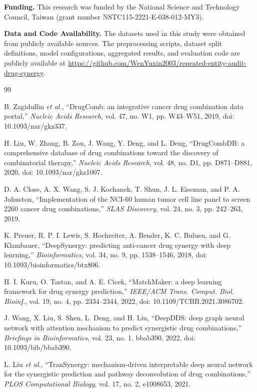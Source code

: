 \documentclass[conference]{IEEEtran}
\begin{document}
\medskip
\noindent\textbf{Funding.}
This research was funded by the National Science and Technology Council, Taiwan (grant number NSTC115-2221-E-038-012-MY3).

\medskip
\noindent\textbf{Data and Code Availability.}
The datasets used in this study were obtained from publicly available sources. The preprocessing scripts, dataset split definitions, model configurations, aggregated results, and evaluation code are publicly available at \url{https://github.com/WenYuxin2003/repeated-entity-audit-drug-synergy}.

\balance
\begin{thebibliography}{99}

B. Zagidullin \emph{et al.}, ``DrugComb: an integrative cancer drug combination data portal,'' \emph{Nucleic Acids Research}, vol. 47, no. W1, pp. W43--W51, 2019, doi: 10.1093/nar/gkz337.

H. Liu, W. Zhang, B. Zou, J. Wang, Y. Deng, and L. Deng, ``DrugCombDB: a comprehensive database of drug combinations toward the discovery of combinatorial therapy,'' \emph{Nucleic Acids Research}, vol. 48, no. D1, pp. D871--D881, 2020, doi: 10.1093/nar/gkz1007.

D. A. Close, A. X. Wang, S. J. Kochanek, T. Shun, J. L. Eiseman, and P. A. Johnston, ``Implementation of the NCI-60 human tumor cell line panel to screen 2260 cancer drug combinations,'' \emph{SLAS Discovery}, vol. 24, no. 3, pp. 242--263, 2019.

K. Preuer, R. P. I. Lewis, S. Hochreiter, A. Bender, K. C. Bulusu, and G. Klambauer, ``DeepSynergy: predicting anti-cancer drug synergy with deep learning,'' \emph{Bioinformatics}, vol. 34, no. 9, pp. 1538--1546, 2018, doi: 10.1093/bioinformatics/btx806.

H. I. Kuru, O. Tastan, and A. E. Cicek, ``MatchMaker: a deep learning framework for drug synergy prediction,'' \emph{IEEE/ACM Trans. Comput. Biol. Bioinf.}, vol. 19, no. 4, pp. 2334--2344, 2022, doi: 10.1109/TCBB.2021.3086702.

J. Wang, X. Liu, S. Shen, L. Deng, and H. Liu, ``DeepDDS: deep graph neural network with attention mechanism to predict synergistic drug combinations,'' \emph{Briefings in Bioinformatics}, vol. 23, no. 1, bbab390, 2022, doi: 10.1093/bib/bbab390.

L. Liu \emph{et al.}, ``TranSynergy: mechanism-driven interpretable deep neural network for the synergistic prediction and pathway deconvolution of drug combinations,'' \emph{PLOS Computational Biology}, vol. 17, no. 2, e1008653, 2021.


\end{thebibliography}
\end{document}
